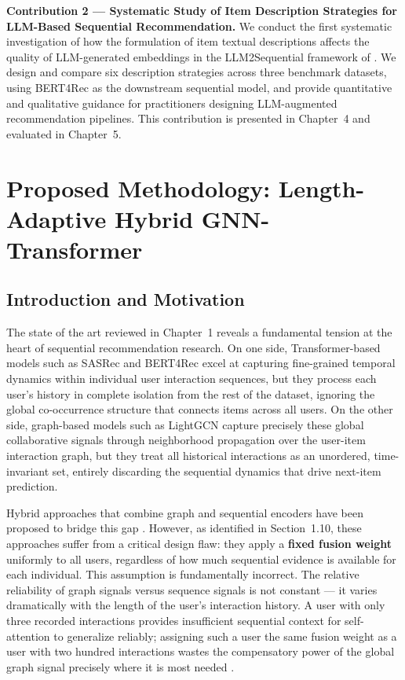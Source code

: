 \documentclass[12pt,a4paper]{report}
\newcommand{\textcite}[1]{\citet{#1}}
\newcommand{\parencite}[1]{\citep{#1}}
\begin{document}
\medskip
\noindent\textbf{Contribution 2 --- Systematic Study of Item
Description Strategies for LLM-Based Sequential Recommendation.}
We conduct the first systematic investigation of how the
formulation of item textual descriptions affects the quality
of LLM-generated embeddings in the LLM2Sequential framework
of \textcite{boz2025improving}. We design and compare six
description strategies across three benchmark datasets, using
BERT4Rec as the downstream sequential model, and provide
quantitative and qualitative guidance for practitioners
designing LLM-augmented recommendation pipelines. This
contribution is presented in Chapter~4 and evaluated in
Chapter~5.



\chapter{Proposed Methodology: Length-Adaptive Hybrid GNN-Transformer}

\section{Introduction and Motivation}

The state of the art reviewed in Chapter~1 reveals a fundamental
tension at the heart of sequential recommendation research. On one
side, Transformer-based models such as SASRec and BERT4Rec excel at
capturing fine-grained temporal dynamics within individual user
interaction sequences, but they process each user's history in
complete isolation from the rest of the dataset, ignoring the global
co-occurrence structure that connects items across all users. On the
other side, graph-based models such as LightGCN capture precisely
these global collaborative signals through neighborhood propagation
over the user-item interaction graph, but they treat all historical
interactions as an unordered, time-invariant set, entirely discarding
the sequential dynamics that drive next-item prediction.

Hybrid approaches that combine graph and sequential encoders have
been proposed to bridge this gap \parencite{he2020lightgcn,
kang2018self}. However, as identified in Section~1.10, these
approaches suffer from a critical design flaw: they apply a
\textbf{fixed fusion weight} uniformly to all users, regardless
of how much sequential evidence is available for each individual.
This assumption is fundamentally incorrect. The relative reliability
of graph signals versus sequence signals is not constant --- it
varies dramatically with the length of the user's interaction
history. A user with only three recorded interactions provides
insufficient sequential context for self-attention to generalize
reliably; assigning such a user the same fusion weight as a user
with two hundred interactions wastes the compensatory power of the
global graph signal precisely where it is most needed
\parencite{ouledmeriem2025hybrid}.
\end{document}
